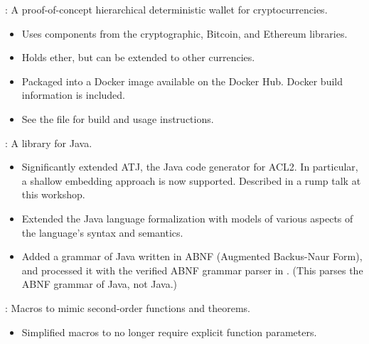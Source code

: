 
\begin{frame}

\implibtitle

:
A proof-of-concept hierarchical deterministic wallet for cryptocurrencies.
\begin{itemize}
\item
Uses components from the cryptographic, Bitcoin, and Ethereum libraries.
\item
Holds ether, but can be extended to other currencies.
\item
Packaged into a Docker image available on the Docker Hub.
Docker build information is included.
\item
See the file 
for build and usage instructions.
\end{itemize}

\end{frame}


\begin{frame}

\implibtitle

:
A library for Java.
\begin{itemize}
\item
Significantly extended ATJ, the Java code generator for ACL2.
In particular, a shallow embedding approach is now supported.
Described in a rump talk at this workshop.
\item
Extended the Java language formalization with models of
various aspects of the language's syntax and semantics.
\item
Added a grammar of Java written in ABNF (Augmented Backus-Naur Form),
and processed it with the verified ABNF grammar parser in .
(This parses the ABNF grammar of Java, not Java.)
\end{itemize}

\separation

:
Macros to mimic second-order functions and theorems.
\begin{itemize}
\item
Simplified macros to no longer require explicit function parameters.
\end{itemize}

\end{frame}

